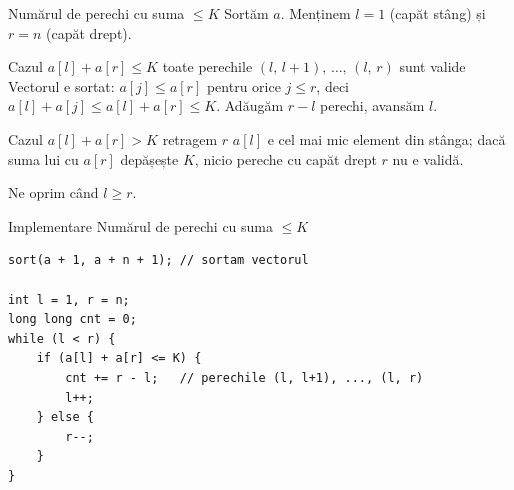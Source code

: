 \documentclass{beamer}
\begin{document}
\begin{frame}{Numărul de perechi cu suma $\leq K$}
  Sortăm $a$. Menținem $l = 1$ (capăt stâng) și $r = n$ (capăt drept).

  \begin{block}{Cazul $a[l]+a[r] \leq K$ \textemdash{} toate perechile $(l,\,l{+}1),\,\ldots,\,(l,\,r)$ sunt valide}
    Vectorul e sortat: $a[j] \leq a[r]$ pentru orice $j \leq r$, deci
    $a[l]+a[j] \leq a[l]+a[r] \leq K$.
    Adăugăm $r-l$ perechi, avansăm $l$.
  \end{block}

  \begin{block}{Cazul $a[l]+a[r] > K$ \textemdash{} retragem $r$}
    $a[l]$ e cel mai mic element din stânga; dacă suma lui cu $a[r]$
    depășește $K$, nicio pereche cu capăt drept $r$ nu e validă.
  \end{block}

  Ne oprim când $l \geq r$.
\end{frame}

\begin{frame}[fragile]{Implementare \textemdash{} Numărul de perechi cu suma $\leq K$}
  \begin{lstlisting}
sort(a + 1, a + n + 1); // sortam vectorul

int l = 1, r = n;
long long cnt = 0;
while (l < r) {
    if (a[l] + a[r] <= K) {
        cnt += r - l;   // perechile (l, l+1), ..., (l, r)
        l++;
    } else {
        r--;
    }
}
  \end{lstlisting}
\end{frame}
\end{document}
